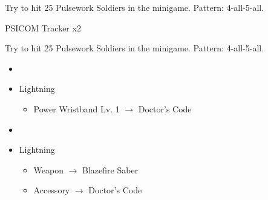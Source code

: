 \begin{paracol}{2}
	Try to hit 25 Pulsework Soldiers in the minigame. Pattern: 4-all-5-all.
	\switchcolumn
	\begin{battle}{PSICOM Tracker x2}
		 
	\end{battle}

	Try to hit 25 Pulsework Soldiers in the minigame. Pattern: 4-all-5-all.

	\switchcolumn*

	\begin{menu}
		\begin{itemize}
			\paradigm
			\begin{itemize}
				\item {}%
				      {\paradigmline{\com}{\rav}{}}%
				      {\paradigmline[2]{\textit{\com}}{\textit{\syn}}{}}%
				      {\paradigmline{\med}{\med}{}}%
				      {\paradigmline{\rav}{\rav}{}}%
				      {\paradigmline{[\rav]}{\rav}{}}%
			\end{itemize}
			\equip
			\begin{itemize}
				\item Lightning
				      \begin{itemize}
					      \item Power Wristband Lv. 1 $\rightarrow$ Doctor's Code
				      \end{itemize}
			\end{itemize}
		\end{itemize}
	\end{menu}
	\switchcolumn
	\begin{menu}
		\begin{itemize}
			\paradigm
			\begin{itemize}
				\item \paradigmdeckfive{%
					      \paradigmline{Lightning}{Hope}{}}%
				      {\paradigmline{\com}{\rav}{}}%
				      {\paradigmline[2]{\textit{\com}}{\textit{\syn}}{}}%
				      {\paradigmline{\med}{\med}{}}%
				      {\paradigmline{\rav}{\rav}{}}%
				      {\paradigmline{\rav}{\rav}{}}%
			\end{itemize}
			\equip
			\begin{itemize}
				\item Lightning
				      \begin{itemize}
					      \item Weapon $\rightarrow$ Blazefire Saber
					      \item Accessory $\rightarrow$ Doctor's Code
				      \end{itemize}
			\end{itemize}
		\end{itemize}
	\end{menu}


\end{paracol}
